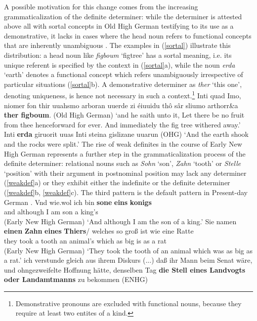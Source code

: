 \documentclass[output=paper
                ,modfonts
                ,nonflat
	        ,collection
	        ,collectionchapter
	        ,collectiontoclongg
 	        ,biblatex
                ,babelshorthands
                ,newtxmath
                ,draftmode
                ,colorlinks, citecolor=brown
]{./langsci/langscibook}
\begin{document}
A possible motivation for this change comes from the increasing grammaticalization of the definite determiner: while the determiner is attested above all with sortal concepts in Old High German testifying to its use as a demonstrative, it lacks in cases where the head noun refers to functional concepts that are inherently unambiguous \citep{demske2001}. The examples in (\ref{sortal}) illustrate this distribution: a head noun like \textit{figboum} `figtree' has a sortal meaning, i.e. its unique referent is specified by the context in (\ref{sortal}a), while the noun \textit{erda} `earth' denotes a functional concept which refers unambiguously irrespective of particular situations (\ref{sortal}b). A demonstrative determiner as \textit{ther} `this one', denoting uniqueness, is hence not necessary in such a context.\footnote{Demonstrative pronouns are excluded with functional nouns, because they require at least two entites of a kind.}
\eal \label{sortal}
\ex Inti quad Imo, niomer fon thir uuahsmo arboran uuerde zi éiuuidu thô sâr sliumo arthorr\&{a} \textbf{ther figboum}. \hfill (Old High German)
\glt `and he saith unto it, Let there be no fruit from thee henceforward for ever. And immediately the fig tree withered away.'
\ex Inti \textbf{erda} giruorit uuas Inti steina gislizane uuarun \hfill (OHG)
\glt `And the earth shook and the rocks were split.'  
\zl
The rise of weak definites in the course of Early New High German represents a further step in the grammaticalization process of the definite determiner: relational nouns such as \textit{Sohn} `son', \textit{Zahn} `tooth' or \textit{Stelle} `position' with their argument in postnominal position may lack any determiner (\ref{weakdef}a) or they exhibit either the indefinite or the definite determiner (\ref{weakdef}b, \ref{weakdef}c). The third pattern is the default pattern in Present-day German \citep{demske2020}.
\eal \label{weakdef}
\ex 
\gll Vnd wie.wol ich bin \textbf{sone} \textbf{eins} \textbf{konigs} \\  and although I am son a king's \\  \hfill (Early New High German)
\glt `And although I am the son of a king.'
\ex 
\gll Sie namen \textbf{einen} \textbf{Zahn} \textbf{eines} \textbf{Thiers}/ welches so groß ist wie eine Ratte \\ they took a tooth an animal's  which as big is as a rat  \\  \hfill (Early New High German)
\glt `They took the tooth of an animal which was as big as a rat.'
\ex ich verstunde gleich aus ihrem Diskurs (...) daß ihr Mann beim Senat wäre, und ohngezweifelte Hoffnung hätte, denselben Tag \textbf{die Stell eines Landvogts oder Landamtmanns} zu bekommen \hfill (ENHG)
\end{document}
